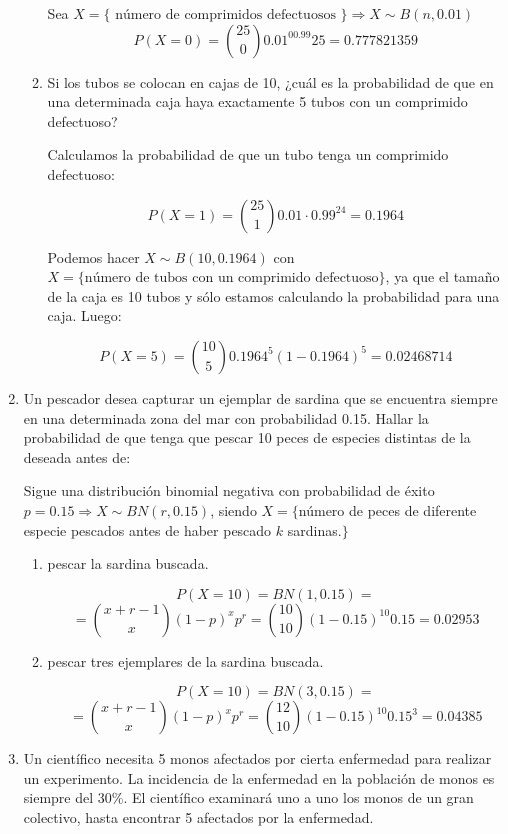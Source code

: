 \documentclass[11pt]{article}
\newcommand{\tick}{\textbf{\color{green}{ (\checkmark) }}}
\begin{document}
\begin{enumerate}
\begin{enumerate}
Sea $X = \{\text{ número de comprimidos defectuosos } \} \Longrightarrow X \sim B(n,0.01)$
\[
P(X=0)=\binom{25}{0}0.01^00.99{25} = 0.777821359
\]

\item Si los tubos se colocan en cajas de 10, ¿cuál es la probabilidad de que en una determinada caja haya exactamente 5 tubos con un comprimido defectuoso?

Calculamos la probabilidad de que un tubo tenga un comprimido defectuoso:

\[
P(X=1)=\binom{25}{1}0.01\cdot 0.99^{24} =0.1964
\]

Podemos hacer $X \sim B(10, 0.1964)$ con $X = \{\text{número de tubos con un comprimido defectuoso}\} $, ya que el tamaño de la caja es 10 tubos y sólo estamos calculando la probabilidad para una caja. Luego:

\[
P(X=5)=\binom{10}{5}0.1964^5(1-0.1964)^5=0.02468714
\]
\end{enumerate}

\item 

\tick Un pescador desea capturar un ejemplar de sardina que se encuentra siempre en una determinada zona del mar con probabilidad 0.15. Hallar la probabilidad de que tenga que pescar 10 peces de especies distintas de la deseada antes de:

Sigue una distribución binomial negativa con probabilidad de éxito $p=0.15 \Longrightarrow X \sim BN(r,0.15)$, siendo $X=\{$número de peces de diferente especie pescados antes de haber pescado $k$ sardinas.$\}$

\begin{enumerate}

\item pescar la sardina buscada.

\[
P(X=10)=BN(1,0.15)=
\]
\[
=\binom{x+r-1}{x}(1-p)^xp^r=\binom{10}{10}(1-0.15)^{10}0.15=0.02953
\]
\item pescar tres ejemplares de la sardina buscada.

\[
P(X=10)=BN(3,0.15)=
\]
\[
=\binom{x+r-1}{x}(1-p)^xp^r=\binom{12}{10}(1-0.15)^{10}0.15^3=0.04385
\]

\end{enumerate}

\item Un científico necesita 5 monos afectados por cierta enfermedad para realizar un experimento. La incidencia de la enfermedad en la población de monos es siempre del 30\%. El científico examinará uno a uno los monos de un gran colectivo, hasta encontrar 5 afectados por la enfermedad.


\end{enumerate}
\end{document}
